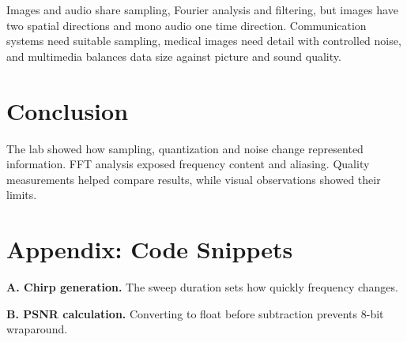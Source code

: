 \documentclass[11pt,a4paper]{article}
\begin{document}
Images and audio share sampling, Fourier analysis and filtering, but images
have two spatial directions and mono audio one time direction. Communication
systems need suitable sampling, medical images need detail with controlled
noise, and multimedia balances data size against picture and sound quality.

\section{Conclusion}
The lab showed how sampling, quantization and noise change represented
information. FFT analysis exposed frequency content and aliasing. Quality
measurements helped compare results, while visual observations showed their limits.

\vspace{-7pt}
\section*{Appendix: Code Snippets}
\small
\textbf{A. Chirp generation.} The sweep duration sets how quickly frequency changes.


\begin{samepage}
\textbf{B. PSNR calculation.} Converting to float before subtraction prevents 8-bit wraparound.

\par\end{samepage}
\end{document}
